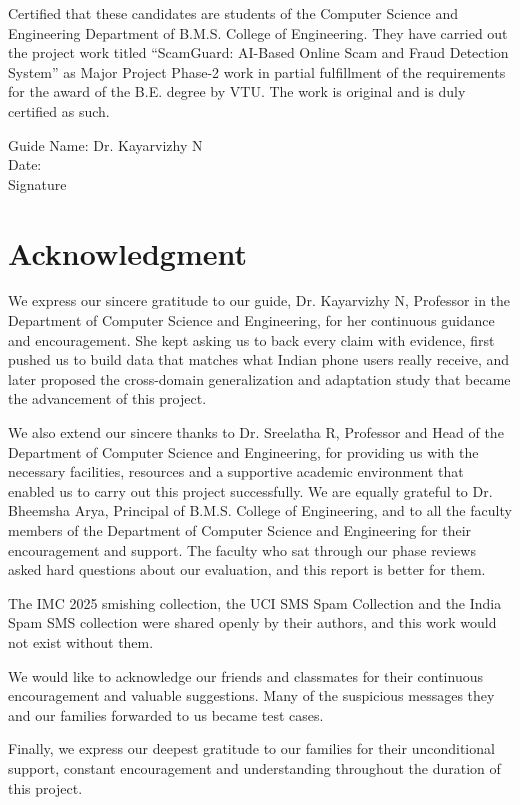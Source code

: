 \vspace{0.3cm}
Certified that these candidates are students of the Computer Science and Engineering Department of B.M.S. College of Engineering. They have carried out the project work titled ``ScamGuard: AI-Based Online Scam and Fraud Detection System'' as Major Project Phase-2 work in partial fulfillment of the requirements for the award of the B.E. degree by VTU. The work is original and is duly certified as such.

\vspace{1cm}
\noindent Guide Name: Dr. Kayarvizhy N\\
Date:\\
Signature
\clearpage

\chapter*{\centering Acknowledgment}
We express our sincere gratitude to our guide, Dr. Kayarvizhy N, Professor in the Department of Computer Science and Engineering, for her continuous guidance and encouragement. She kept asking us to back every claim with evidence, first pushed us to build data that matches what Indian phone users really receive, and later proposed the cross-domain generalization and adaptation study that became the advancement of this project.

We also extend our sincere thanks to Dr. Sreelatha R, Professor and Head of the Department of Computer Science and Engineering, for providing us with the necessary facilities, resources and a supportive academic environment that enabled us to carry out this project successfully. We are equally grateful to Dr. Bheemsha Arya, Principal of B.M.S. College of Engineering, and to all the faculty members of the Department of Computer Science and Engineering for their encouragement and support. The faculty who sat through our phase reviews asked hard questions about our evaluation, and this report is better for them.

The IMC 2025 smishing collection, the UCI SMS Spam Collection and the India Spam SMS collection were shared openly by their authors, and this work would not exist without them.

We would like to acknowledge our friends and classmates for their continuous encouragement and valuable suggestions. Many of the suspicious messages they and our families forwarded to us became test cases.

Finally, we express our deepest gratitude to our families for their unconditional support, constant encouragement and understanding throughout the duration of this project.
\clearpage
{}
\setcounter{page}{1}
